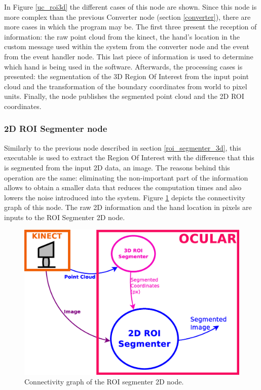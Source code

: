 	In Figure \ref{uc_roi3d} the different cases of this node are shown. 
	Since this node is more complex than the previous Converter node (section \ref{converter}), there are more cases in which the program may be. 
	The first three present the reception of information: the raw point cloud from the kinect, the hand's location in the custom message used within the system from the converter node and the event from the event handler node. 
	This last piece of information is used to determine which hand is being used in the software. 
	Afterwards, the processing cases is presented: the segmentation of the 3D Region Of Interest from the input point cloud and the transformation of the boundary coordinates from world to pixel units. 
	Finally, the node publishes the segmented point cloud and the 2D ROI coordinates. 



\subsubsection{2D ROI Segmenter node}
	\label{roi_segmenter_2d}
	
	Similarly to the previous node described in section \ref{roi_segmenter_3d}, this executable is used to extract the Region Of Interest with the difference that this is segmented from the input 2D data, an image. 
	The reasons behind this operation are the same: eliminating the non-important part of the information allows to obtain a smaller data that reduces the computation times and also lowers the noise introduced into the system. 
	Figure \ref{node_roi2d} depicts the connectivity graph of this node. 
	The raw 2D information and the hand location in pixels are inputs to the ROI Segmenter 2D node. 

	\vspace{0.5cm}
	\begin{figure}[H]
			\begin{center}
			\includegraphics[width=0.5\linewidth]{img/diagrams/node_roi2d.eps}
			\caption[ROI segmenter 2D node I/O]{Connectivity graph of the ROI segmenter 2D node.}		
			\label{node_roi2d}
			\end{center}
		\end{figure}

